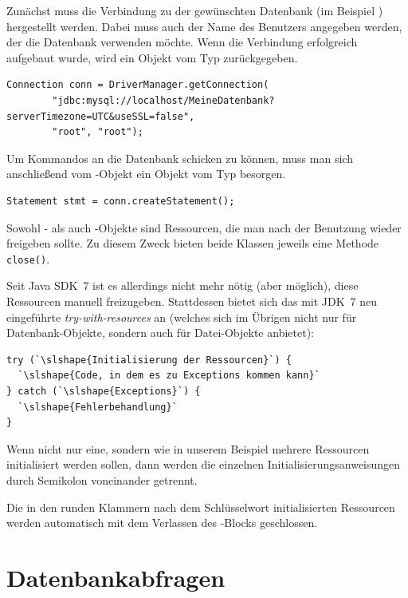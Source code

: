 Zunächst muss die Verbindung zu der gewünschten Datenbank (im Beispiel
) hergestellt werden. Dabei muss auch der Name des
Benutzers angegeben werden, der die Datenbank verwenden möchte. Wenn die
Verbindung erfolgreich aufgebaut wurde, wird ein Objekt vom Typ
 zurückgegeben.

\begin{lstlisting}
Connection conn = DriverManager.getConnection(
        "jdbc:mysql://localhost/MeineDatenbank?serverTimezone=UTC&useSSL=false",
        "root", "root");
\end{lstlisting}

Um Kommandos an die Datenbank schicken zu können, muss man sich anschließend vom
-Objekt ein Objekt vom Typ  besorgen.

\begin{lstlisting}
Statement stmt = conn.createStatement();
\end{lstlisting}

Sowohl - als auch -Objekte sind
Ressourcen, die man nach der Benutzung wieder freigeben sollte. Zu diesem Zweck
bieten beide Klassen jeweils eine Methode \lstinline|close()|.

Seit Java SDK~7 ist es allerdings nicht mehr nötig (aber möglich), diese
Ressourcen manuell freizugeben. Stattdessen bietet sich das mit JDK~7 neu
eingeführte \emph{try-with-resources} an (welches sich im Übrigen nicht
nur für Datenbank-Objekte, sondern auch für Datei-Objekte anbietet):

\begin{lstlisting}
try (`\slshape{Initialisierung der Ressourcen}`) {
  `\slshape{Code, in dem es zu Exceptions kommen kann}`
} catch (`\slshape{Exceptions}`) {
  `\slshape{Fehlerbehandlung}`
}
\end{lstlisting}

Wenn nicht nur eine, sondern wie in unserem Beispiel mehrere Ressourcen
initialisiert werden sollen, dann werden die einzelnen
Initialisierungsanweisungen durch Semikolon voneinander getrennt.

Die in den runden Klammern nach dem Schlüsselwort 
initialisierten Ressourcen werden automatisch mit dem Verlassen des
-Blocks geschlossen.


\section{Datenbankabfragen}

